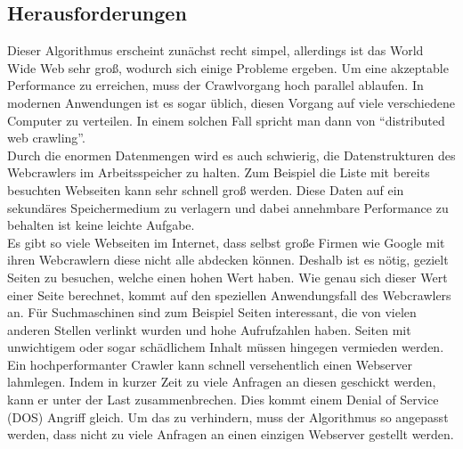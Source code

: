 \subsection{Herausforderungen}
Dieser Algorithmus erscheint zunächst recht simpel, allerdings ist das World Wide Web sehr groß, wodurch sich einige Probleme ergeben. %
Um eine akzeptable Performance zu erreichen, muss der Crawlvorgang hoch parallel ablaufen. In modernen Anwendungen ist es sogar üblich, diesen Vorgang auf viele verschiedene Computer zu verteilen. In einem solchen Fall spricht man dann von \enquote{distributed web crawling}. \\
Durch die enormen Datenmengen wird es auch schwierig, die Datenstrukturen des Webcrawlers im Arbeitsspeicher zu halten. Zum Beispiel die Liste mit bereits besuchten Webseiten kann sehr schnell groß werden. Diese Daten auf ein sekundäres Speichermedium zu verlagern und dabei annehmbare Performance zu behalten ist keine leichte Aufgabe. \\
Es gibt so viele Webseiten im Internet, dass selbst große Firmen wie Google mit ihren Webcrawlern diese nicht alle abdecken können. Deshalb ist es nötig, gezielt Seiten zu besuchen, welche einen hohen Wert haben. Wie genau sich dieser Wert einer Seite berechnet, kommt auf den speziellen Anwendungsfall des Webcrawlers an. Für Suchmaschinen sind zum Beispiel Seiten interessant, die von vielen anderen Stellen verlinkt wurden und hohe Aufrufzahlen haben. Seiten mit unwichtigem oder sogar schädlichem Inhalt müssen hingegen vermieden werden. \\
Ein hochperformanter Crawler kann schnell versehentlich einen Webserver lahmlegen. Indem in kurzer Zeit zu viele Anfragen an diesen geschickt werden, kann er unter der Last zusammenbrechen. Dies kommt einem Denial of Service (DOS) Angriff gleich. Um das zu verhindern, muss der Algorithmus so angepasst werden, dass nicht zu viele Anfragen an einen einzigen Webserver gestellt werden.

